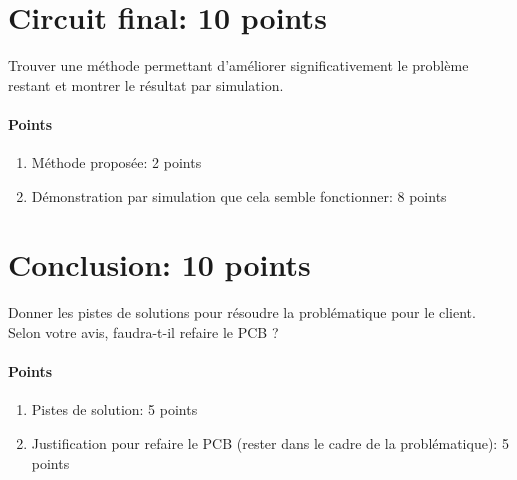 \documentclass[DIV=15,paper=letter,titlepage=true,fontsize=12pt,headings=normal,captions=nooneline]{scrartcl}
\begin{document}
\section{Circuit final: 10 points}
Trouver une méthode permettant d'améliorer significativement le problème restant et montrer le résultat par simulation.

\paragraph{Points} 
\begin{enumerate}
	\item Méthode proposée: 2 points
	\item Démonstration par simulation que cela semble fonctionner: 8 points
\end{enumerate}

\section{Conclusion: 10 points}
Donner les pistes de solutions pour résoudre la problématique pour le client. Selon votre avis, faudra-t-il refaire le PCB ?

\paragraph{Points} 
\begin{enumerate}
	\item Pistes de solution: 5 points
	\item Justification pour refaire le PCB (rester dans le cadre de la problématique): 5 points
\end{enumerate}
\end{document}
